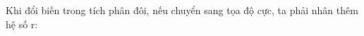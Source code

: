 \documentclass[preview]{standalone}
\begin{document}
\begin{center}
Khi đổi biến trong tích phân đôi, nếu chuyển sang tọa độ cực, ta phải nhân thêm hệ số r:
\end{center}
\end{document}
